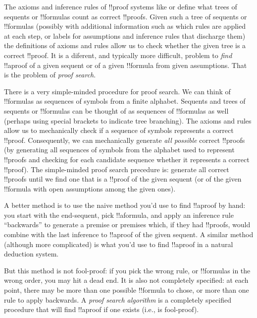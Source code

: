 \documentclass[../../../include/open-logic-section]{subfiles}
\begin{document}


The axioms and inference rules of !!{proof} systems like  or
 define what trees of sequents or !!{formula}s count as
correct !!{proof}s. Given such a tree of sequents or !!{formula}s
(possibly with additional information such as which rules are applied
at each step, or labels for assumptions and inference rules that
discharge them) the definitions of axioms and rules allow us to check
whether the given tree is a correct !!{proof}. It is a diferent, and
typically more difficult, problem to \emph{find} !!a{proof} of a given
sequent or of a given !!{formula} from given assumptions. That is the
problem of \emph{proof search}.

There is a very simple-minded procedure for proof search. We can think
of !!{formula}s as sequences of symbols from a finite alphabet.
Sequents and trees of sequents or !!{formula}s can be thought of as
sequences of !!{formula}s as well (perhaps using special brackets to
indicate tree branching). The axioms and rules allow us to
mechanically check if a sequence of symbols represents a correct
!!{proof}. Consequently, we can mechanically generate \emph{all
possible} correct !!{proof}s (by generating all sequences of symbols
from the alphabet used to represent !!{proof}s and checking for each
candidate sequence whether it represents a correct !!{proof}). The
simple-minded proof search precedure is: generate all correct
!!{proof}s until we find one that is a !!{proof} of the given sequent
(or of the given !!{formula} with open assumptions among the given
ones).

A better method is to use the naive method you'd use to find
!!a{proof} by hand: you start with the end-sequent, pick !!a{formula},
and apply an inference rule ``backwards'' to generate a premise or
premises which, if they had !!{proof}s, would combine with the last
inference to !!a{proof} of the given sequent. A similar method
(although more complicated) is what you'd use to find !!a{proof} in a
natural deduction system.

But this method is not fool-proof: if you pick the wrong rule, or
!!{formula}s in the wrong order, you may hit a dead end. It is also
not completely specified: at each point, there may be more than one
possible !!{formula} to chose, or more than one rule to apply
backwards. A \emph{proof search algorithm} is a completely specified
procedure that will find !!a{proof} if one exists (i.e., is
fool-proof).
\end{document}
